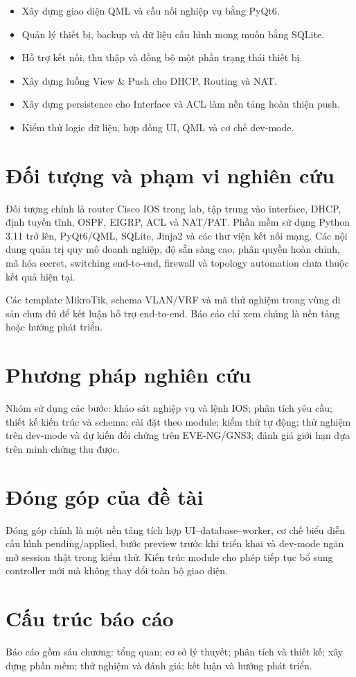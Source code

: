 \begin{itemize}
  \item Xây dựng giao diện QML và cầu nối nghiệp vụ bằng PyQt6.
  \item Quản lý thiết bị, backup và dữ liệu cấu hình mong muốn bằng SQLite.
  \item Hỗ trợ kết nối, thu thập và đồng bộ một phần trạng thái thiết bị.
  \item Xây dựng luồng View \& Push cho DHCP, Routing và NAT.
  \item Xây dựng persistence cho Interface và ACL làm nền tảng hoàn thiện push.
  \item Kiểm thử logic dữ liệu, hợp đồng UI, QML và cơ chế dev-mode.
\end{itemize}

\section{Đối tượng và phạm vi nghiên cứu}

Đối tượng chính là router Cisco IOS trong lab, tập trung vào interface, DHCP, định tuyến tĩnh, OSPF, EIGRP, ACL và NAT/PAT. Phần mềm sử dụng Python 3.11 trở lên, PyQt6/QML, SQLite, Jinja2 và các thư viện kết nối mạng. Các nội dung quản trị quy mô doanh nghiệp, độ sẵn sàng cao, phân quyền hoàn chỉnh, mã hóa secret, switching end-to-end, firewall và topology automation chưa thuộc kết quả hiện tại.

\begin{reportnote}
Các template MikroTik, schema VLAN/VRF và mã thử nghiệm trong vùng di sản chưa đủ để kết luận hỗ trợ end-to-end. Báo cáo chỉ xem chúng là nền tảng hoặc hướng phát triển.
\end{reportnote}

\section{Phương pháp nghiên cứu}

Nhóm sử dụng các bước: khảo sát nghiệp vụ và lệnh IOS; phân tích yêu cầu; thiết kế kiến trúc và schema; cài đặt theo module; kiểm thử tự động; thử nghiệm trên dev-mode và dự kiến đối chứng trên EVE-NG/GNS3; đánh giá giới hạn dựa trên minh chứng thu được.

\section{Đóng góp của đề tài}

Đóng góp chính là một nền tảng tích hợp UI--database--worker, cơ chế biểu diễn cấu hình pending/applied, bước preview trước khi triển khai và dev-mode ngăn mở session thật trong kiểm thử. Kiến trúc module cho phép tiếp tục bổ sung controller mới mà không thay đổi toàn bộ giao diện.

\section{Cấu trúc báo cáo}

Báo cáo gồm sáu chương: tổng quan; cơ sở lý thuyết; phân tích và thiết kế; xây dựng phần mềm; thử nghiệm và đánh giá; kết luận và hướng phát triển.
